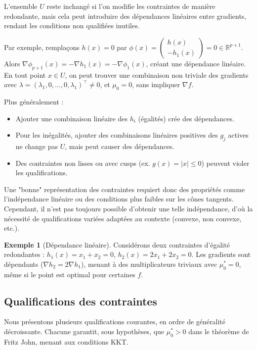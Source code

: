 \documentclass[a4paper,12pt,openany]{book}
\theoremstyle{plain}
\theoremstyle{definition}
\newtheorem{example}[theorem]{Exemple}
\theoremstyle{remark}
\theoremstyle{nbstyle}
\begin{document}
	L'ensemble \( U \) reste inchangé si l'on modifie les contraintes de manière redondante, mais cela peut introduire des dépendances linéaires entre gradients, rendant les conditions non qualifiées inutiles.
	
	Par exemple, remplaçons \( h(x) = 0 \) par \( \phi(x) = \begin{pmatrix} h(x) \\ -h_1(x) \end{pmatrix} = 0 \in \mathbb{R}^{p+1} \). Alors \( \nabla \phi_{p+1}(x) = -\nabla h_1(x) = -\nabla \phi_1(x) \), créant une dépendance linéaire. En tout point \( x \in U \), on peut trouver une combinaison non triviale des gradients avec \( \lambda = (\lambda_1, 0, \dots, 0, \lambda_1)^\top \neq 0 \), et \( \mu_0 = 0 \), sans impliquer \( \nabla f \).
	
	Plus généralement :
	\begin{itemize}
		\item Ajouter une combinaison linéaire des \( h_i \) (égalités) crée des dépendances.
		\item Pour les inégalités, ajouter des combinaisons linéaires positives des \( g_j \) actives ne change pas \( U \), mais peut causer des dépendances.
		\item Des contraintes non lisses ou avec cusps (ex. \( g(x) = |x| \leq 0 \)) peuvent violer les qualifications.
	\end{itemize}
	
	Une "bonne" représentation des contraintes requiert donc des propriétés comme l'indépendance linéaire ou des conditions plus faibles sur les cônes tangents. Cependant, il n'est pas toujours possible d'obtenir une telle indépendance, d'où la nécessité de qualifications variées adaptées au contexte (convexe, non convexe, etc.).
	
	\begin{example}[Dépendance linéaire]
		Considérons deux contraintes d'égalité redondantes : \( h_1(x) = x_1 + x_2 = 0 \), \( h_2(x) = 2x_1 + 2x_2 = 0 \). Les gradients sont dépendants (\( \nabla h_2 = 2 \nabla h_1 \)), menant à des multiplicateurs triviaux avec \( \mu_0^* = 0 \), même si le point est optimal pour certaines \( f \).
	\end{example}
	
	\subsection{Qualifications des contraintes}
	
	Nous présentons plusieurs qualifications courantes, en ordre de généralité décroissante. Chacune garantit, sous hypothèses, que \( \mu_0^* > 0 \) dans le théorème de Fritz John, menant aux conditions KKT.
	
\end{document}
